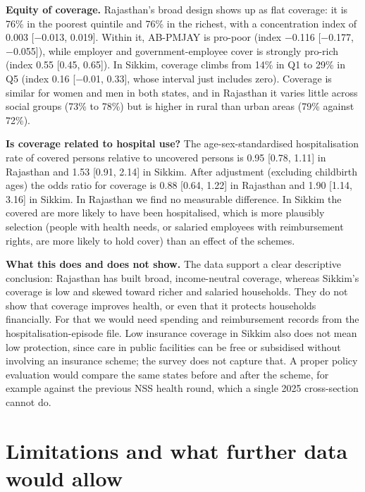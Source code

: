 \documentclass[10pt,a4paper]{article}
\begin{document}
\textbf{Equity of coverage.} Rajasthan's broad design shows up as flat coverage: it is 76\% in the poorest quintile and 76\% in the richest, with a concentration index of 0.003 [$-$0.013, 0.019]. Within it, AB-PMJAY is pro-poor (index $-$0.116 [$-$0.177, $-$0.055]), while employer and government-employee cover is strongly pro-rich (index 0.55 [0.45, 0.65]). In Sikkim, coverage climbs from 14\% in Q1 to 29\% in Q5 (index 0.16 [$-$0.01, 0.33], whose interval just includes zero). Coverage is similar for women and men in both states, and in Rajasthan it varies little across social groups (73\% to 78\%) but is higher in rural than urban areas (79\% against 72\%).


\textbf{Is coverage related to hospital use?} The age-sex-standardised hospitalisation rate of covered persons relative to uncovered persons is 0.95 [0.78, 1.11] in Rajasthan and 1.53 [0.91, 2.14] in Sikkim. After adjustment (excluding childbirth ages) the odds ratio for coverage is 0.88 [0.64, 1.22] in Rajasthan and 1.90 [1.14, 3.16] in Sikkim. In Rajasthan we find no measurable difference. In Sikkim the covered are more likely to have been hospitalised, which is more plausibly selection (people with health needs, or salaried employees with reimbursement rights, are more likely to hold cover) than an effect of the schemes.


\textbf{What this does and does not show.} The data support a clear descriptive conclusion: Rajasthan has built broad, income-neutral coverage, whereas Sikkim's coverage is low and skewed toward richer and salaried households. They do not show that coverage improves health, or even that it protects households financially. For that we would need spending and reimbursement records from the hospitalisation-episode file. Low insurance coverage in Sikkim also does not mean low protection, since care in public facilities can be free or subsidised without involving an insurance scheme; the survey does not capture that. A proper policy evaluation would compare the same states before and after the scheme, for example against the previous NSS health round, which a single 2025 cross-section cannot do.


\section{Limitations and what further data would allow}
\end{document}
